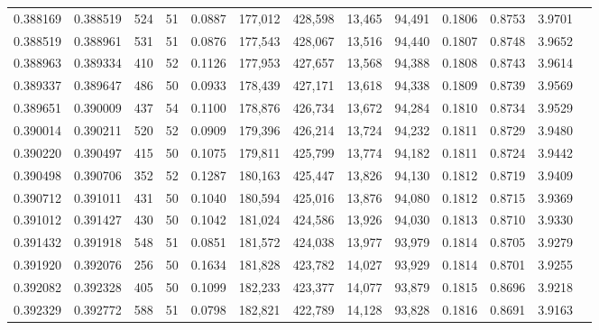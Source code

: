 \begin{tabular}{rrrrrrrrrrrrr}
0.388169 & 0.388519 &   524 &  51 &                                     0.0887 & 177,012 & 428,598 &  13,465 &  94,491 & 0.1806 & 0.8753 & 3.9701 \\
0.388519 & 0.388961 &   531 &  51 &                                     0.0876 & 177,543 & 428,067 &  13,516 &  94,440 & 0.1807 & 0.8748 & 3.9652 \\
0.388963 & 0.389334 &   410 &  52 &                                     0.1126 & 177,953 & 427,657 &  13,568 &  94,388 & 0.1808 & 0.8743 & 3.9614 \\
0.389337 & 0.389647 &   486 &  50 &                                     0.0933 & 178,439 & 427,171 &  13,618 &  94,338 & 0.1809 & 0.8739 & 3.9569 \\
0.389651 & 0.390009 &   437 &  54 &                                     0.1100 & 178,876 & 426,734 &  13,672 &  94,284 & 0.1810 & 0.8734 & 3.9529 \\
0.390014 & 0.390211 &   520 &  52 &                                     0.0909 & 179,396 & 426,214 &  13,724 &  94,232 & 0.1811 & 0.8729 & 3.9480 \\
0.390220 & 0.390497 &   415 &  50 &                                     0.1075 & 179,811 & 425,799 &  13,774 &  94,182 & 0.1811 & 0.8724 & 3.9442 \\
0.390498 & 0.390706 &   352 &  52 &                                     0.1287 & 180,163 & 425,447 &  13,826 &  94,130 & 0.1812 & 0.8719 & 3.9409 \\
0.390712 & 0.391011 &   431 &  50 &                                     0.1040 & 180,594 & 425,016 &  13,876 &  94,080 & 0.1812 & 0.8715 & 3.9369 \\
0.391012 & 0.391427 &   430 &  50 &                                     0.1042 & 181,024 & 424,586 &  13,926 &  94,030 & 0.1813 & 0.8710 & 3.9330 \\
0.391432 & 0.391918 &   548 &  51 &                                     0.0851 & 181,572 & 424,038 &  13,977 &  93,979 & 0.1814 & 0.8705 & 3.9279 \\
0.391920 & 0.392076 &   256 &  50 &                                     0.1634 & 181,828 & 423,782 &  14,027 &  93,929 & 0.1814 & 0.8701 & 3.9255 \\
0.392082 & 0.392328 &   405 &  50 &                                     0.1099 & 182,233 & 423,377 &  14,077 &  93,879 & 0.1815 & 0.8696 & 3.9218 \\
0.392329 & 0.392772 &   588 &  51 &                                     0.0798 & 182,821 & 422,789 &  14,128 &  93,828 & 0.1816 & 0.8691 & 3.9163 \\

\end{tabular}
